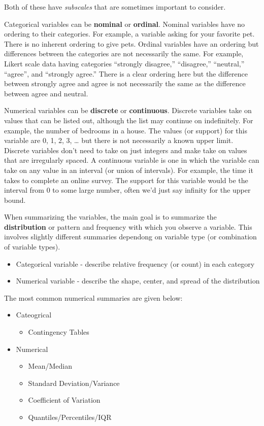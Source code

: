 \documentclass[
]{book}
\providecommand{\tightlist}{%
  \setlength{\itemsep}{0pt}\setlength{\parskip}{0pt}}
\theoremstyle{definition}
\theoremstyle{definition}
\theoremstyle{definition}
\theoremstyle{remark}
\begin{document}
Both of these have \emph{subscales} that are sometimes important to consider.

Categorical variables can be \textbf{nominal} or \textbf{ordinal}. Nominal variables have no ordering to their categories. For example, a variable asking for your favorite pet. There is no inherent ordering to give pets. Ordinal variables have an ordering but differences between the categories are not necessarily the same. For example, Likert scale data having categories ``strongly disagree,'' ``disagree,'' ``neutral,'' ``agree'', and ``strongly agree.'' There is a clear ordering here but the difference between strongly agree and agree is not necessarily the same as the difference between agree and neutral.

Numerical variables can be \textbf{discrete} or \textbf{continuous}. Discrete variables take on values that can be listed out, although the list may continue on indefinitely. For example, the number of bedrooms in a house. The values (or support) for this variable are 0, 1, 2, 3, \ldots{} but there is not necessarily a known upper limit. Discrete variables don't need to take on just integers and make take on values that are irregularly spaced. A continuous variable is one in which the variable can take on any value in an interval (or union of intervals). For example, the time it takes to complete an online survey. The support for this variable would be the interval from 0 to some large number, often we'd just say infinity for the upper bound.

When summarizing the variables, the main goal is to summarize the \textbf{distribution} or pattern and frequency with which you observe a variable. This involves slightly different summaries dependong on variable type (or combination of variable types).

\begin{itemize}
\item
  Categorical variable - describe relative frequency (or count) in each category
\item
  Numerical variable - describe the shape, center, and spread of the distribution
\end{itemize}

The most common numerical summaries are given below:

\begin{itemize}
\item
  Cateogrical

  \begin{itemize}
  \tightlist
  \item
    Contingency Tables
  \end{itemize}
\item
  Numerical

  \begin{itemize}
  \tightlist
  \item
    Mean/Median\\
  \item
    Standard Deviation/Variance
  \item
    Coefficient of Variation
  \item
    Quantiles/Percentiles/IQR
  \end{itemize}
\end{itemize}
\end{document}
